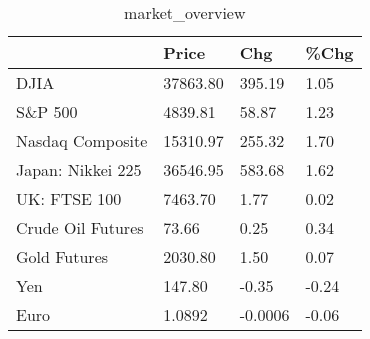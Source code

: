 \documentclass{article}%
\begin{document}
%


\begin{table}[htbp]%
\caption{market\_overview}%
\centering%
\begin{adjustbox}{width=1\textwidth}%
\begin{tabular}{llll}
\toprule
                  &    Price &     Chg &  \%Chg \\
\midrule
             DJIA & 37863.80 &  395.19 &  1.05 \\
          S\&P 500 &  4839.81 &   58.87 &  1.23 \\
 Nasdaq Composite & 15310.97 &  255.32 &  1.70 \\
Japan: Nikkei 225 & 36546.95 &  583.68 &  1.62 \\
     UK: FTSE 100 &  7463.70 &    1.77 &  0.02 \\
Crude Oil Futures &    73.66 &    0.25 &  0.34 \\
     Gold Futures &  2030.80 &    1.50 &  0.07 \\
              Yen &   147.80 &   -0.35 & -0.24 \\
             Euro &   1.0892 & -0.0006 & -0.06 \\
\bottomrule
\end{tabular}
%
\end{adjustbox}%
\end{table}

%
\end{document}
